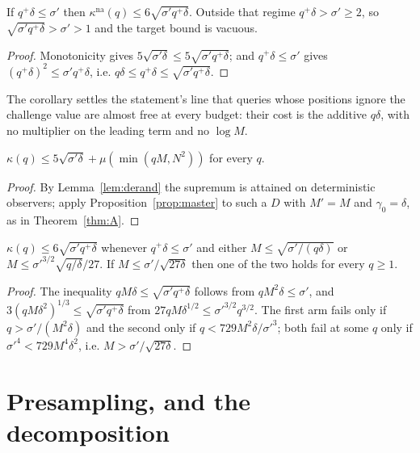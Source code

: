 \documentclass{aicr-solution}
\newcommand{\kna}{\kappa^{\mathrm{na}}}
\begin{document}
\begin{corollary}\label{cor:A}
If $q^{+}\delta\le\sigma'$ then $\kna(q)\le6\sqrt{\sigma'q^{+}\delta}$. Outside
that regime $q^{+}\delta>\sigma'\ge2$, so $\sqrt{\sigma'q^{+}\delta}>\sigma'>1$
and the target bound is vacuous.
\end{corollary}

\begin{proof}
Monotonicity gives $5\sqrt{\sigma'\delta}\le5\sqrt{\sigma'q^{+}\delta}$; and $q^{+}\delta\le\sigma'$
gives $(q^{+}\delta)^{2}\le\sigma'q^{+}\delta$, i.e.
$q\delta\le q^{+}\delta\le\sqrt{\sigma'q^{+}\delta}$.
\end{proof}

The corollary settles the statement's line that queries whose positions ignore the
challenge value are almost free at every budget: their cost is the additive
$q\delta$, with no multiplier on the leading term and no $\log M$.

\begin{theorem}\label{thm:B}
$\kappa(q)\le5\sqrt{\sigma'\delta}+\mu(\min(qM,N^{2}))$ for every $q$.
\end{theorem}

\begin{proof}
By Lemma~\ref{lem:derand} the supremum is attained on deterministic observers;
apply Proposition~\ref{prop:master} to such a $D$ with $M'=M$ and
$\gamma_0=\delta$, as in Theorem~\ref{thm:A}.
\end{proof}

\begin{corollary}\label{cor:B}
$\kappa(q)\le6\sqrt{\sigma'q^{+}\delta}$ whenever $q^{+}\delta\le\sigma'$ and
either $M\le\sqrt{\sigma'/(q\delta)}$ or
$M\le\sigma'^{3/2}\sqrt{q/\delta}/27$. If $M\le\sigma'/\sqrt{27\delta}$ then one
of the two holds for every $q\ge1$.
\end{corollary}

\begin{proof}
The inequality $qM\delta\le\sqrt{\sigma'q^{+}\delta}$ follows from $qM^{2}\delta\le\sigma'$, and
$3(qM\delta^{2})^{1/3}\le\sqrt{\sigma'q^{+}\delta}$ from
$27qM\delta^{1/2}\le\sigma'^{3/2}q^{3/2}$. The first arm fails only if
$q>\sigma'/(M^{2}\delta)$ and the second only if $q<729M^{2}\delta/\sigma'^{3}$;
both fail at some $q$ only if $\sigma'^{4}<729M^{4}\delta^{2}$, i.e.
$M>\sigma'/\sqrt{27\delta}$.
\end{proof}

\section{Presampling, and the decomposition}
\end{document}

